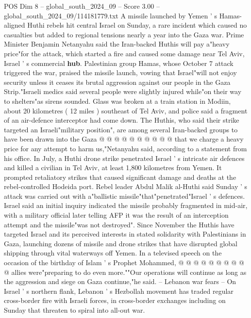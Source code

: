 \begin{textsample}{POS Dim 8 – global\_south\_2024\_09 – Score 3.00 – global\_south\_2024\_09/114181779.txt}  \label{ex:f8_pos_285}
A missile launched by Yemen ' s Hamas-aligned Huthi rebels hit central Israel on Sunday, a rare incident which caused no casualties but added to regional tensions nearly a year into the Gaza war.
Prime Minister Benjamin Netanyahu said the Iran-backed Huthis will pay a"heavy price"for the attack, which started a fire and caused some damage near Tel Aviv, Israel ' s commercial \textbf{hub}.
Palestinian group Hamas, whose October 7 attack triggered the war, praised the missile launch, vowing that Israel"will not enjoy security unless it ceases its brutal aggression against our people in the Gaza Strip."Israeli medics said several people were slightly injured while"on their way to shelters"as sirens sounded.
Glass was broken at a train station in Modiin, about 20 kilometres ( 12 miles ) southeast of Tel Aviv, and police said a fragment of an air-defence interceptor had come down.
The Huthis, who said their strike targeted an Israeli"military position", are among several Iran-backed groups to have been drawn into the Gaza @ @ @ @ @ @ @ @ @ @ that we charge a heavy price for any attempt to harm us,"Netanyahu said, according to a statement from his office.
In July, a Huthi drone strike penetrated Israel ' s intricate air defences and killed a civilian in Tel Aviv, at least 1,800 kilometres from Yemen.
It prompted retaliatory strikes that caused significant damage and deaths at the rebel-controlled Hodeida port.
Rebel leader Abdul Malik al-Huthi said Sunday ' s attack was carried out with a"ballistic missile"that"penetrated"Israel ' s defences.
Israel said an initial inquiry indicated the missile probably fragmented in mid-air, with a military official later telling AFP it was the result of an interception attempt and the missile"was not destroyed".
Since November the Huthis have targeted Israel and its perceived interests in stated solidarity with Palestinians in Gaza, launching dozens of missile and drone strikes that have disrupted global shipping through vital waterways off Yemen.
In a televised speech on the occasion of the birthday of Islam ' s Prophet Mohammed, @ @ @ @ @ @ @ @ @ @ allies were"preparing to do even more.""Our operations will continue as long as the aggression and siege on Gaza continue,"he said. -- Lebanon war fears -- On Israel ' s northern flank, Lebanon ' s Hezbollah movement has traded regular cross-border fire with Israeli forces, in cross-border exchanges including on Sunday that threaten to spiral into all-out war.

\end{textsample}
